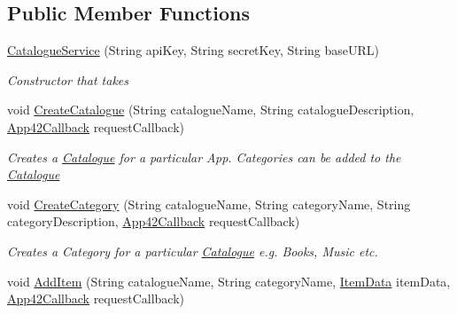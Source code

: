 \subsection*{Public Member Functions}
\begin{DoxyCompactItemize}
\item 
\hyperlink{classcom_1_1shephertz_1_1app42_1_1paas_1_1sdk_1_1windows_1_1shopping_1_1_catalogue_service_a54fe15e813bfbe89c152ff31ce3767ae}{Catalogue\+Service} (String api\+Key, String secret\+Key, String base\+U\+R\+L)
\begin{DoxyCompactList}\small\item\em Constructor that takes \end{DoxyCompactList}\item 
void \hyperlink{classcom_1_1shephertz_1_1app42_1_1paas_1_1sdk_1_1windows_1_1shopping_1_1_catalogue_service_a6a3451272206041d6e6a5d1b0b8b3525}{Create\+Catalogue} (String catalogue\+Name, String catalogue\+Description, \hyperlink{interfacecom_1_1shephertz_1_1app42_1_1paas_1_1sdk_1_1windows_1_1_app42_callback}{App42\+Callback} request\+Callback)
\begin{DoxyCompactList}\small\item\em Creates a \hyperlink{classcom_1_1shephertz_1_1app42_1_1paas_1_1sdk_1_1windows_1_1shopping_1_1_catalogue}{Catalogue} for a particular App. Categories can be added to the \hyperlink{classcom_1_1shephertz_1_1app42_1_1paas_1_1sdk_1_1windows_1_1shopping_1_1_catalogue}{Catalogue} \end{DoxyCompactList}\item 
void \hyperlink{classcom_1_1shephertz_1_1app42_1_1paas_1_1sdk_1_1windows_1_1shopping_1_1_catalogue_service_abbebd86d94224221d5f0526a7e1bcd8a}{Create\+Category} (String catalogue\+Name, String category\+Name, String category\+Description, \hyperlink{interfacecom_1_1shephertz_1_1app42_1_1paas_1_1sdk_1_1windows_1_1_app42_callback}{App42\+Callback} request\+Callback)
\begin{DoxyCompactList}\small\item\em Creates a Category for a particular \hyperlink{classcom_1_1shephertz_1_1app42_1_1paas_1_1sdk_1_1windows_1_1shopping_1_1_catalogue}{Catalogue} e.\+g. Books, Music etc. \end{DoxyCompactList}\item 
void \hyperlink{classcom_1_1shephertz_1_1app42_1_1paas_1_1sdk_1_1windows_1_1shopping_1_1_catalogue_service_a923bf4d26a7599fda82e418f59d9c166}{Add\+Item} (String catalogue\+Name, String category\+Name, \hyperlink{classcom_1_1shephertz_1_1app42_1_1paas_1_1sdk_1_1windows_1_1shopping_1_1_item_data}{Item\+Data} item\+Data, \hyperlink{interfacecom_1_1shephertz_1_1app42_1_1paas_1_1sdk_1_1windows_1_1_app42_callback}{App42\+Callback} request\+Callback)

\end{DoxyCompactItemize}
